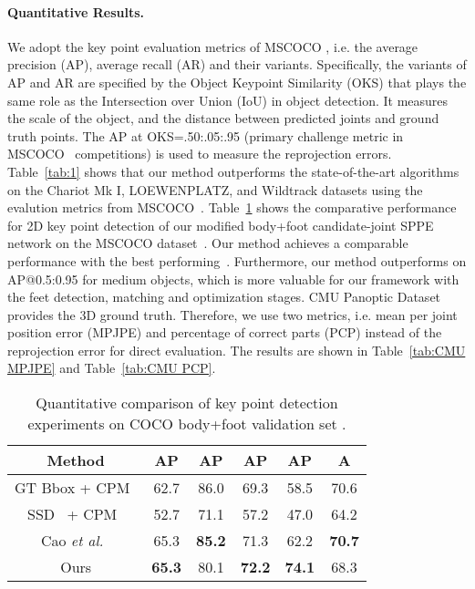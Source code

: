 \documentclass[runningheads]{llncs}
\begin{document}
\paragraph {\bf{Quantitative Results. }} We adopt the key point evaluation metrics of MSCOCO \cite{lin2014microsoft}, i.e. the average precision (AP), average recall (AR) and their variants. Specifically, the variants of AP and AR are specified by the Object Keypoint Similarity (OKS) that plays the same role as the Intersection over Union (IoU) in object detection. It measures the scale of the object, and the distance between predicted joints and ground truth points. The AP at OKS=.50:.05:.95 (primary challenge metric in MSCOCO~\cite{lin2014microsoft} competitions) is used to measure the reprojection errors. Table~\ref{tab:1} shows that our method outperforms the state-of-the-art algorithms on the Chariot Mk I, LOEWENPLATZ, and Wildtrack datasets using the evalution metrics from MSCOCO~\cite{lin2014microsoft}. Table~\ref{tab:2} shows the comparative performance for 2D key point detection of our modified body+foot candidate-joint SPPE network on the MSCOCO dataset~\cite{lin2014microsoft}. 
Our method achieves a comparable performance with the best performing~\cite{Authors14}. Furthermore, our method outperforms on AP@0.5:0.95 for medium objects, which is more valuable for our framework with the feet detection, matching and optimization stages.
CMU Panoptic Dataset provides the 3D ground truth. Therefore, we use two metrics, i.e. mean per joint position error (MPJPE) and percentage of correct parts (PCP) instead of the reprojection error for direct evaluation. The results are shown in Table~\ref{tab:CMU MPJPE} and Table~\ref{tab:CMU PCP}.
\begin{table}[!hbt]
\setlength{\tabcolsep}{4pt}
\scriptsize
\caption{Quantitative comparison of key point detection experiments on COCO body+foot validation set \cite{cao2018openpose}. }
\scriptsize
\begin{center}
\begin{tabular}{c|c|cccc} 
\hline
Method &\textbf{AP} & AP & AP & AP &  A\\
\hline\hline
GT Bbox + CPM~\cite{Authors45} & 62.7 & 86.0 & 69.3 & 58.5 & 70.6 \\
SSD~\cite{Authors07} + CPM~\cite{Authors45} & 52.7 & 71.1 & 57.2 & 47.0&64.2 \\
Cao \textit{et al.}~\cite{Authors14}& 65.3 &  \textbf{85.2} & 71.3 & 62.2 &  \textbf{70.7} \\
Ours & \textbf{65.3} & 80.1 & \textbf{72.2} & \textbf{74.1} &68.3  \\
\hline
\end{tabular}
\end{center}
\label{tab:2}
\end{table}
\end{document}
